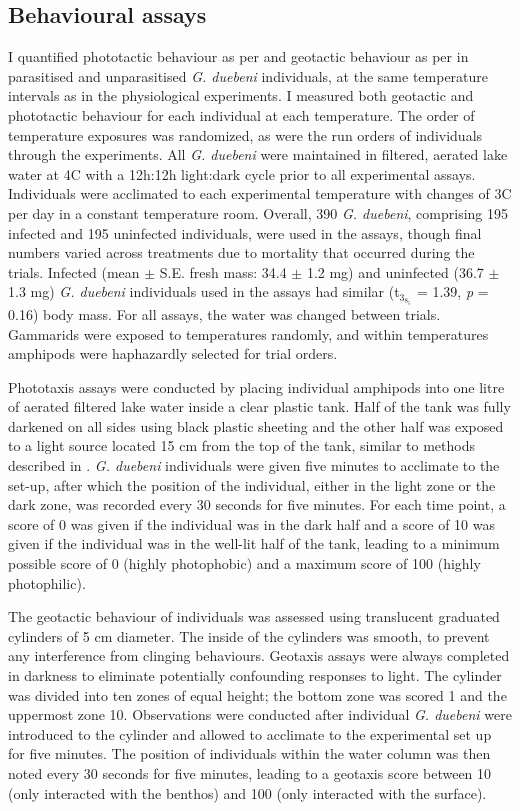 \subsection{Behavioural assays}
I quantified phototactic behaviour as per \citet{perrot2004} and geotactic behaviour as per \citet{bauer2005} in parasitised and unparasitised \emph{G. duebeni} individuals, at the same temperature intervals as in the physiological experiments. I measured both geotactic and phototactic behaviour for each individual at each temperature. The order of temperature exposures was randomized, as were the run orders of individuals through the experiments. All \emph{G. duebeni} were maintained in filtered, aerated lake water at 4\degree C with a 12h:12h light:dark cycle prior to all experimental assays. Individuals were acclimated to each experimental temperature with changes of 3\degree C per day in a constant temperature room. Overall, 390 \emph{G. duebeni}, comprising 195 infected and 195 uninfected individuals, were used in the assays, though final numbers varied across treatments due to mortality that occurred during the trials. Infected (mean $\pm$ S.E. fresh mass: 34.4 $\pm$ 1.2 mg) and uninfected (36.7 $\pm$ 1.3 mg) \emph{G. duebeni} individuals used in the assays had similar (t$_3_8_5$ = 1.39, \emph{p} = 0.16) body mass. For all assays, the water was changed between trials. Gammarids were exposed to temperatures randomly, and within temperatures amphipods were haphazardly selected for trial orders.

Phototaxis assays were conducted by placing individual amphipods into one litre of aerated filtered lake water inside a clear plastic tank. Half of the tank was fully darkened on all sides using black plastic sheeting and the other half was exposed to a light source located 15 cm from the top of the tank, similar to methods described in \citet{perrot2004}. \emph{G. duebeni} individuals were given five minutes to acclimate to the set-up, after which the position of the individual, either in the light zone or the dark zone, was recorded every 30 seconds for five minutes. For each time point, a score of 0 was given if the individual was in the dark half and a score of 10 was given if the individual was in the well-lit half of the tank, leading to a minimum possible score of 0 (highly photophobic) and a maximum score of 100 (highly photophilic).  	

The geotactic behaviour of individuals was assessed using translucent graduated cylinders of 5 cm diameter. The inside of the cylinders was smooth, to prevent any interference from clinging behaviours. Geotaxis assays were always completed in darkness to eliminate potentially confounding responses to light. The cylinder was divided into ten zones of equal height; the bottom zone was scored 1 and the uppermost zone 10. Observations were conducted after individual \emph{G. duebeni} were introduced to the cylinder and allowed to acclimate to the experimental set up for five minutes. The position of individuals within the water column was then noted every 30 seconds for five minutes, leading to a geotaxis score between 10 (only interacted with the benthos) and 100 (only interacted with the surface).  

